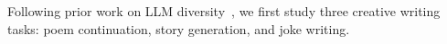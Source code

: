 \begin{figure}[t]
{  \vspace{-1em}
   }
    \label{fig:creativity_main}
\end{figure}




Following prior work on LLM diversity~\citep{lu2025aihumanityssalieriquantifying}, we first study three creative writing tasks: poem continuation, story generation, and joke writing.


